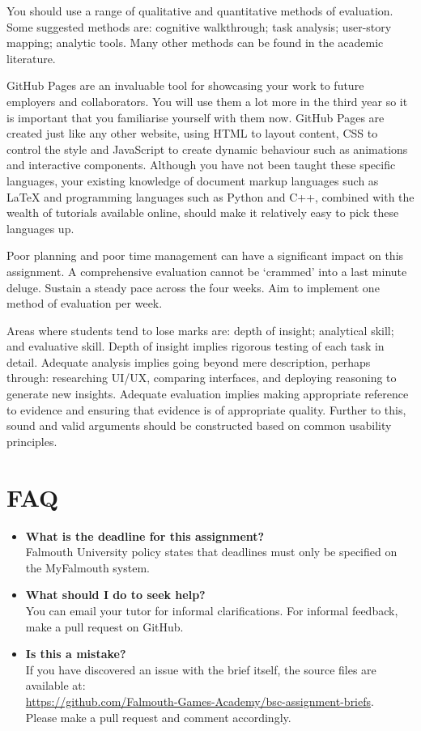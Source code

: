 \documentclass{../../fal_assignment}
\begin{document}
You should use a range of qualitative and quantitative methods of evaluation. Some suggested methods are: cognitive walkthrough; task analysis; user-story mapping; analytic tools. Many other methods can be found in the academic literature.

GitHub Pages are an invaluable tool for showcasing your work to future employers and collaborators. You will use them a lot more in the third year so it is important that you familiarise yourself with them now. GitHub Pages are created just like any other website, using HTML to layout content, CSS to control the style and JavaScript to create dynamic behaviour such as animations and interactive components. Although you have not been taught these specific languages, your existing knowledge of document markup languages such as LaTeX and programming languages such as Python and C++, combined with the wealth of tutorials available online, should make it relatively easy to pick these languages up.

Poor planning and poor time management can have a significant impact on this assignment. A comprehensive evaluation cannot be `crammed' into a last minute deluge. Sustain a steady pace across the four weeks. Aim to implement one method of evaluation per week.

Areas where students tend to lose marks are: depth of insight; analytical skill; and evaluative skill. Depth of insight implies rigorous testing of each task in detail. Adequate analysis implies going beyond mere description, perhaps through: researching UI/UX, comparing interfaces, and deploying reasoning to generate new insights. Adequate evaluation implies making appropriate reference to evidence and ensuring that evidence is of appropriate quality. Further to this, sound and valid arguments should be constructed based on common usability principles. 

\section*{FAQ}

\begin{itemize}
	\item 	\textbf{What is the deadline for this assignment?} \\ 
    		Falmouth University policy states that deadlines must only be specified on the MyFalmouth system.
    		
	\item 	\textbf{What should I do to seek help?} \\ 
    		You can email your tutor for informal clarifications. For informal feedback, make a pull request on GitHub. 
    		
    	\item 	\textbf{Is this a mistake?} \\ 	
    		If you have discovered an issue with the brief itself, the source files are available at: \\
    		\url{https://github.com/Falmouth-Games-Academy/bsc-assignment-briefs}.\\
    		 Please make a pull request and comment accordingly.
\end{itemize}
\end{document}
